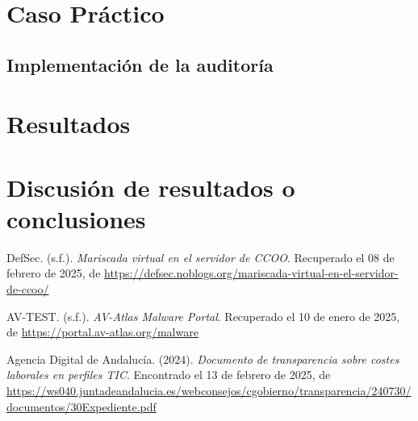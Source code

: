 \documentclass[a4paper, 10pt]{article}
\begin{document}
\section{Caso Práctico}

\subsection{Implementación de la auditoría}


\clearpage

\section{Resultados}



\clearpage

\section{Discusión de resultados o conclusiones}



\clearpage

\begin{thebibliography}{20}
    
    DefSec. (s.f.). \textit{Mariscada virtual en el servidor de CCOO}. Recuperado el 08 de febrero de 2025, de \url{https://defsec.noblogs.org/mariscada-virtual-en-el-servidor-de-ccoo/}
    
    AV-TEST. (s.f.). \textit{AV-Atlas Malware Portal}. Recuperado el 10 de enero de 2025, de \url{https://portal.av-atlas.org/malware}
    
    Agencia Digital de Andalucía. (2024). \textit{Documento de transparencia sobre costes laborales en perfiles TIC}. Encontrado el 13 de febrero de 2025, de \url{https://ws040.juntadeandalucia.es/webconsejos/cgobierno/transparencia/240730/documentos/30Expediente.pdf}
    

\end{thebibliography}


\clearpage
\end{document}

